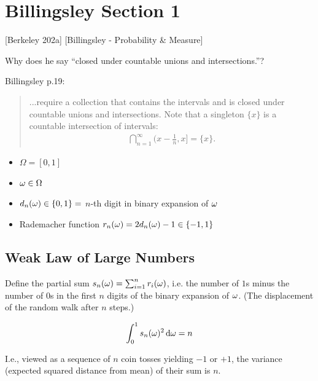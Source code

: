 \section{Billingsley Section 1}
[Berkeley 202a]
[Billingsley - Probability \& Measure]

Why does he say ``closed under countable unions and intersections.​''?

  Billingsley p.19:
  \begin{quote}
    ...require a collection that contains the intervals and is closed under countable unions and intersections.
    Note that a singleton $\{x\}$ is a countable intersection of intervals:
    \begin{align*}
      \bigcap_{n=1}^\infty \Big(x -\frac{1}{n}, x\Big] = \{x\}.
    \end{align*}
  \end{quote}


\begin{itemize}
\item $\Omega = [0, 1]$
\item $\omega \in \Omega$
\item $d_n(\omega) \in \{0, 1\} = $ $n$-th digit in binary expansion of $\omega$
\item Rademacher function $r_n(\omega) = 2d_n(\omega) - 1 \in \{-1, 1\}$
\end{itemize}

\subsection{Weak Law of Large Numbers}

Define the partial sum $s_n(\omega) = \sum_{i=1}^n r_i(\omega)$, i.e. the number of $1$s minus the number of $0$s in
the first $n$ digits of the binary expansion of $\omega$. (The displacement of the random walk after $n$ steps.)

\begin{lemma}
  \begin{align*}
    \int_0^1 s_n(\om)^2 \d\om = n
  \end{align*}
\end{lemma}

I.e., viewed as a sequence of $n$ coin tosses yielding $-1$ or $+1$, the variance (expected squared distance
from mean) of their sum is $n$.

